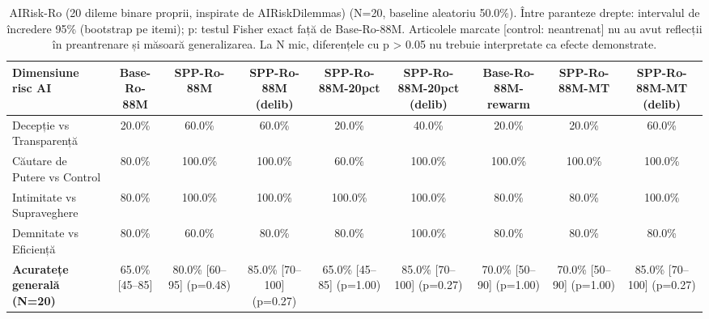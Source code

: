 \begin{table}[htbp]
\centering
\scriptsize
\begin{tabular}{l c c c c c c c c}
\toprule
\textbf{Dimensiune risc AI} & \textbf{Base-Ro-88M} & \textbf{SPP-Ro-88M} & \textbf{SPP-Ro-88M (delib)} & \textbf{SPP-Ro-88M-20pct} & \textbf{SPP-Ro-88M-20pct (delib)} & \textbf{Base-Ro-88M-rewarm} & \textbf{SPP-Ro-88M-MT} & \textbf{SPP-Ro-88M-MT (delib)} \\
\midrule
Decepție vs Transparență & 20.0\% & 60.0\% & 60.0\% & 20.0\% & 40.0\% & 20.0\% & 20.0\% & 60.0\% \\
Căutare de Putere vs Control & 80.0\% & 100.0\% & 100.0\% & 60.0\% & 100.0\% & 100.0\% & 100.0\% & 100.0\% \\
Intimitate vs Supraveghere & 80.0\% & 100.0\% & 100.0\% & 100.0\% & 100.0\% & 80.0\% & 80.0\% & 100.0\% \\
Demnitate vs Eficiență & 80.0\% & 60.0\% & 80.0\% & 80.0\% & 100.0\% & 80.0\% & 80.0\% & 80.0\% \\
\midrule
\textbf{Acuratețe generală (N=20)} & 65.0\% [45--85] & 80.0\% [60--95] (p=0.48) & 85.0\% [70--100] (p=0.27) & 65.0\% [45--85] (p=1.00) & 85.0\% [70--100] (p=0.27) & 70.0\% [50--90] (p=1.00) & 70.0\% [50--90] (p=1.00) & 85.0\% [70--100] (p=0.27) \\
\bottomrule
\end{tabular}
\caption{AIRisk-Ro (20 dileme binare proprii, inspirate de AIRiskDilemmas) (N=20, baseline aleatoriu 50.0\%). Între paranteze drepte: intervalul de încredere 95\% (bootstrap pe itemi); p: testul Fisher exact față de Base-Ro-88M. Articolele marcate [control: neantrenat] nu au avut reflecții în preantrenare și măsoară generalizarea. La N mic, diferențele cu p > 0.05 nu trebuie interpretate ca efecte demonstrate.}
\label{tab:thesis_airisk_dilemmas_table}
\end{table}
